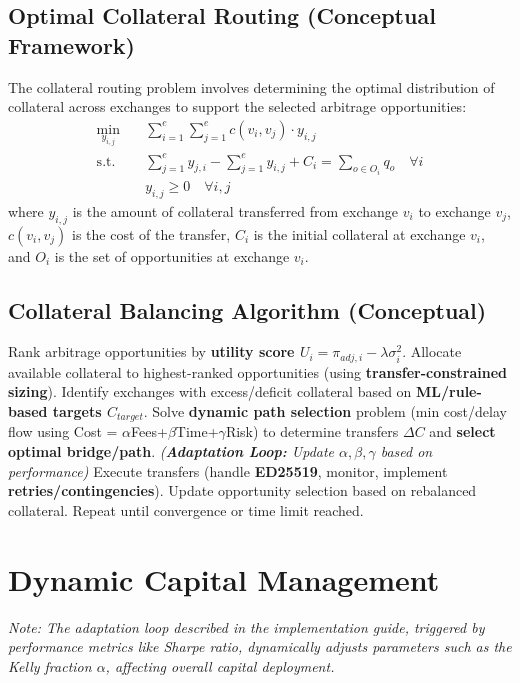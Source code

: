 \documentclass{article}
\begin{document}
\subsection{Optimal Collateral Routing (Conceptual Framework)}

The collateral routing problem involves determining the optimal distribution of collateral across exchanges to support the selected arbitrage opportunities:
\begin{align}
\min_{y_{i,j}} \quad & \sum_{i=1}^e \sum_{j=1}^e c(v_i, v_j) \cdot y_{i,j} \\
\text{s.t.} \quad & \sum_{j=1}^e y_{j,i} - \sum_{j=1}^e y_{i,j} + C_i = \sum_{o \in O_i} q_o \quad \forall i \\
& y_{i,j} \geq 0 \quad \forall i,j
\end{align}
where $y_{i,j}$ is the amount of collateral transferred from exchange $v_i$ to exchange $v_j$, $c(v_i, v_j)$ is the cost of the transfer, $C_i$ is the initial collateral at exchange $v_i$, and $O_i$ is the set of opportunities at exchange $v_i$.

\subsection{Collateral Balancing Algorithm (Conceptual)}

\begin{algorithm}
\caption{Collateral Rebalancing Algorithm (Conceptual - See Guide/Diagram for Detail)}
\begin{algorithmic}[1]
\STATE Rank arbitrage opportunities by \textbf{utility score $U_i = \pi_{adj,i} - \lambda \sigma_i^2$}.
\STATE Allocate available collateral to highest-ranked opportunities (using \textbf{transfer-constrained sizing}).
\STATE Identify exchanges with excess/deficit collateral based on \textbf{ML/rule-based targets $C_{target}$}.
\STATE Solve \textbf{dynamic path selection} problem (min cost/delay flow using Cost = $\alpha$Fees+$\beta$Time+$\gamma$Risk) to determine transfers $\Delta C$ and \textbf{select optimal bridge/path}. \textit{(\textbf{Adaptation Loop:} Update $\alpha, \beta, \gamma$ based on performance)}
\STATE Execute transfers (handle \textbf{ED25519}, monitor, implement \textbf{retries/contingencies}).
\STATE Update opportunity selection based on rebalanced collateral.
\STATE Repeat until convergence or time limit reached.
\end{algorithmic}
\end{algorithm}

\section{Dynamic Capital Management}
\textit{Note: The adaptation loop described in the implementation guide, triggered by performance metrics like Sharpe ratio, dynamically adjusts parameters such as the Kelly fraction $\alpha$, affecting overall capital deployment.}
\end{document}

